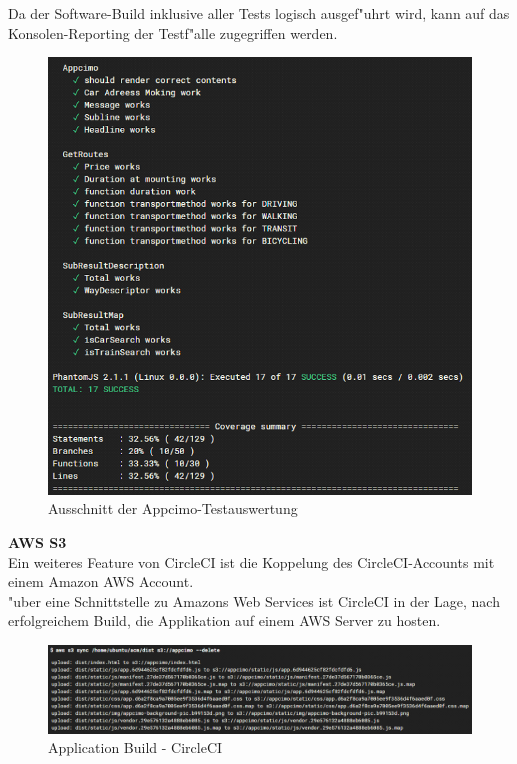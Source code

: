 \documentclass[a4paper, 11pt]{scrreprt}
\begin{document}
Da der Software-Build inklusive aller Tests logisch ausgef"uhrt wird, kann auf das Konsolen-Reporting der Testf"alle zugegriffen werden. \\


\begin{figure} [H]
\begin{center}
\includegraphics[scale=0.7]{build2.png}
\caption{Ausschnitt der Appcimo-Testauswertung}
\label{circlecitest}
\end{center}
\end{figure}


\textbf{AWS S3} \\
Ein weiteres Feature von CircleCI ist die Koppelung des CircleCI-Accounts mit einem Amazon AWS Account. \\
"uber eine Schnittstelle zu Amazons Web Services ist CircleCI in der Lage, nach erfolgreichem Build, die Applikation auf einem AWS Server zu hosten.\\

\begin{figure} [H]
\begin{center}
\includegraphics[scale=0.7]{build3.png}
\caption{Application Build - CircleCI}
\label{circlecitest}
\end{center}
\end{figure}
\end{document}
